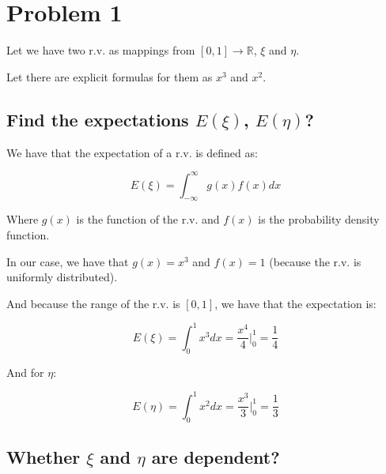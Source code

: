 \section*{Problem 1}

Let we have two r.v. as mappings from $[0,1] \to \mathbb{R}$, $\xi$ and $\eta$.

Let there are explicit formulas for them as $x^3$ and $x^2$.





\subsection*{Find the expectations $E(\xi)$, $E(\eta)$?}

We have that the expectation of a r.v. is defined as:

\begin{equation*}
    E(\xi) = \int_{-\infty}^{\infty} g(x) f(x) dx
\end{equation*}

Where $g(x)$ is the function of the r.v. and $f(x)$ is the probability density function.

In our case, we have that $g(x) = x^3$ and $f(x) = 1$ (because the r.v. is uniformly distributed).

And because the range of the r.v. is $[0,1]$, we have that the expectation is:

\begin{equation*}
    E(\xi) = \int_{0}^{1} x^3 dx = \frac{x^4}{4} \Big|_{0}^{1} = \frac{1}{4}
\end{equation*}

And for $\eta$:

\begin{equation*}
    E(\eta) = \int_{0}^{1} x^2 dx = \frac{x^3}{3} \Big|_{0}^{1} = \frac{1}{3}
\end{equation*}

\subsection*{Whether $\xi$ and $\eta$ are dependent?}

